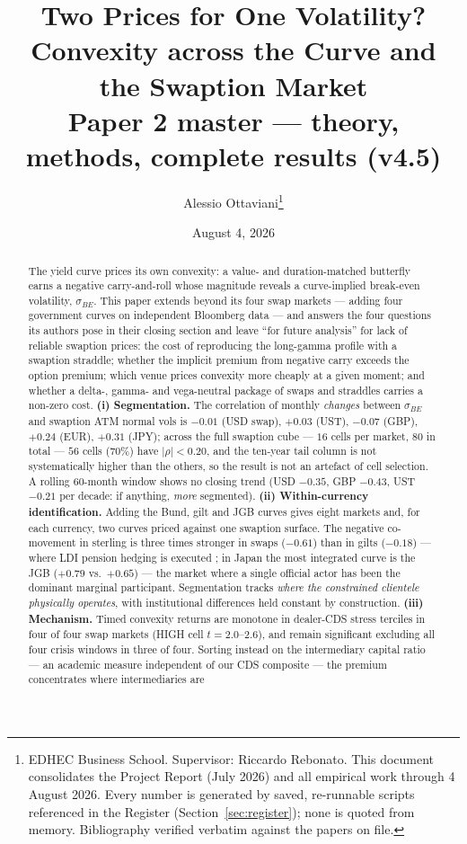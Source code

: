 \documentclass[11pt]{article}
\title{Two Prices for One Volatility?\\ Convexity across the Curve and the Swaption Market\\[4pt]
\large Paper 2 master --- theory, methods, complete results (v4.5)}
\author{Alessio Ottaviani\thanks{EDHEC Business School. Supervisor: Riccardo Rebonato. This document
consolidates the Project Report (July 2026) and all empirical work through 4 August 2026. Every number
is generated by saved, re-runnable scripts referenced in the Register (Section~\ref{sec:register});
none is quoted from memory. Bibliography verified verbatim against the papers on file.}}
\date{August 4, 2026}
\newcommand{\sBE}{\sigma_{BE}}
\begin{document}
\maketitle

\begin{abstract}
\noindent The yield curve prices its own convexity: a value- and duration-matched butterfly earns a
negative carry-and-roll whose magnitude reveals a curve-implied break-even volatility, $\sBE$. This
paper extends \citet{rr2021} beyond its four swap markets --- adding four government curves on
independent Bloomberg data --- and answers the four questions its authors
pose in their closing section and leave ``for future analysis'' for lack of reliable swaption prices:
the cost of reproducing the long-gamma profile with a swaption straddle; whether the implicit premium
from negative carry exceeds the option premium; which venue prices convexity more cheaply at a given
moment; and whether a delta-, gamma- and vega-neutral package of swaps and straddles carries a
non-zero cost. \textbf{(i) Segmentation.} The correlation of monthly \emph{changes} between $\sBE$ and
swaption ATM normal vols is $-0.01$ (USD swap), $+0.03$ (UST), $-0.07$ (GBP), $+0.24$ (EUR), $+0.31$
(JPY); across the full swaption cube --- $16$ cells per market, $80$ in total --- $56$ cells ($70\%$)
have $|\rho|<0.20$, and the ten-year tail column is not systematically higher than the others, so the
result is not an artefact of cell selection. A rolling 60-month window shows no closing trend
(USD $-0.35$, GBP $-0.43$, UST $-0.21$ per decade: if anything, \emph{more} segmented).
\textbf{(ii) Within-currency identification.} Adding the Bund, gilt and JGB curves gives eight markets
and, for each currency, two curves priced against one swaption surface. The negative co-movement in
sterling is three times stronger in swaps ($-0.61$) than in gilts ($-0.18$) --- where LDI pension
hedging is executed \citep{ks2023}; in Japan the most integrated curve is the JGB ($+0.79$ vs.\ $+0.65$)
--- the market where a single official actor has been the dominant marginal participant. Segmentation tracks \emph{where the constrained
clientele physically operates}, with institutional differences held constant by construction.
\textbf{(iii) Mechanism.} Timed convexity returns are monotone in dealer-CDS stress terciles in four
of four swap markets (HIGH cell $t=2.0$--$2.6$), and remain significant excluding all four crisis
windows in three of four. Sorting instead on the \citet{hkm2017} intermediary capital ratio --- an
academic measure independent of our CDS composite --- the premium concentrates where intermediaries are

\end{abstract}
\end{document}
